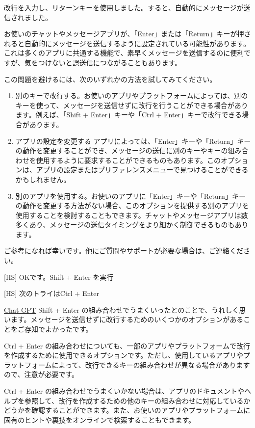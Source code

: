 \documentclass[
]{bxjsbook}
\theoremstyle{definition}
\theoremstyle{definition}
\theoremstyle{definition}
\theoremstyle{definition}
\theoremstyle{remark}
\begin{document}
改行を入力し、リターンキーを使用しました。すると、自動的にメッセージが送信されました。

お使いのチャットやメッセージアプリが、「Enter」または「Return」キーが押されると自動的にメッセージを送信するように設定されている可能性があります。これは多くのアプリに共通する機能で、素早くメッセージを送信するのに便利ですが、気をつけないと誤送信につながることもあります。

この問題を避けるには、次のいずれかの方法を試してみてください。

\begin{enumerate}
\def\labelenumi{\arabic{enumi}.}
\item
  別のキーで改行する。お使いのアプリやプラットフォームによっては、別のキーを使って、メッセージを送信せずに改行を行うことができる場合があります。例えば、「Shift + Enter」キーや「Ctrl + Enter」キーで改行できる場合があります。
\item
  アプリの設定を変更する アプリによっては、「Enter」キーや「Return」キーの動作を変更することができ、メッセージの送信に別のキーやキーの組み合わせを使用するように要求することができるものもあります。このオプションは、アプリの設定またはプリファレンスメニューで見つけることができるかもしれません。
\item
  別のアプリを使用する。お使いのアプリに「Enter」キーや「Return」キーの動作を変更する方法がない場合、このオプションを提供する別のアプリを使用することを検討することもできます。チャットやメッセージアプリは数多くあり、メッセージの送信タイミングをより細かく制御できるものもあります。
\end{enumerate}

ご参考になれば幸いです。他にご質問やサポートが必要な場合は、ご連絡ください。

{[}HS{]} OKです。Shift + Enter を実行

{[}HS{]} 次のトライはCtrl + Enter

\protect\hyperlink{chatgpt}{Chat GPT} Shift + Enter の組み合わせでうまくいったとのことで、うれしく思います。メッセージを送信せずに改行するためのいくつかのオプションがあることをご存知でよかったです。

Ctrl + Enter の組み合わせについても、一部のアプリやプラットフォームで改行を作成するために使用できるオプションです。ただし、使用しているアプリやプラットフォームによって、改行できるキーの組み合わせが異なる場合がありますので、注意が必要です。

Ctrl + Enter の組み合わせでうまくいかない場合は、アプリのドキュメントやヘルプを参照して、改行を作成するための他のキーの組み合わせに対応しているかどうかを確認することができます。また、お使いのアプリやプラットフォームに固有のヒントや裏技をオンラインで検索することもできます。
\end{document}
